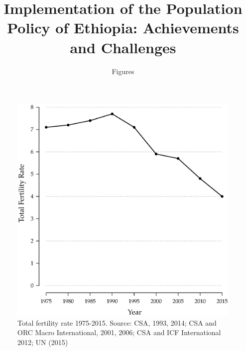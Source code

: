 \documentclass[a4paper, twocolumn]{article}
\begin{document}
\title{Implementation of the Population Policy of Ethiopia: Achievements and Challenges}
\author{Figures}

\maketitle

\begin{figure}[!hbtp]
\includegraphics[width = \columnwidth]{../figures/fig1.eps}
\caption{Total fertility rate 1975-2015. Source: CSA, 1993, 2014; CSA and ORC Macro International, 2001, 2006; CSA and ICF International 2012; UN (2015)}
\end{figure}
\end{document}
